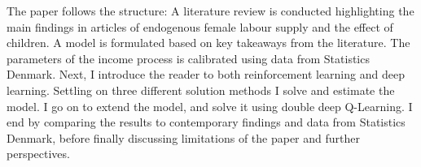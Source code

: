 The paper follows the structure: A literature review is conducted highlighting the main findings in articles of endogenous female labour supply and the effect of children. A model is formulated based on key takeaways from the literature. The parameters of the income process is calibrated using data from Statistics Denmark. Next, I introduce the reader to both reinforcement learning and deep learning. Settling on three different solution methods I solve and estimate the model. I go on to extend the model, and solve it using double deep Q-Learning. I end by comparing the results to contemporary findings and data from Statistics Denmark, before finally discussing limitations of the paper and further perspectives.